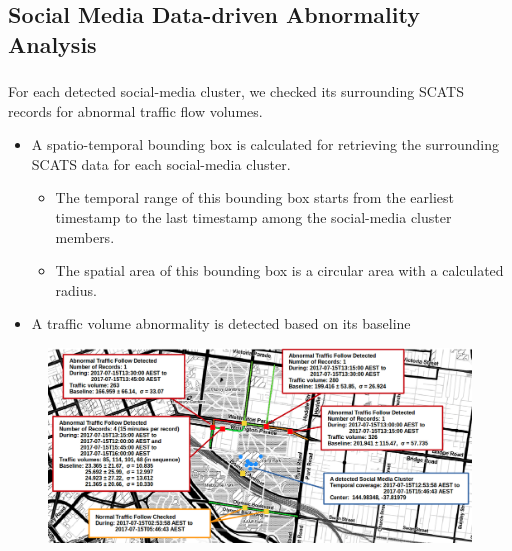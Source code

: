 \subsection{Social Media Data-driven Abnormality Analysis}
\begin{frame}
    \frametitle{}
	 For each detected social-media cluster, we checked its surrounding SCATS records for abnormal traffic flow volumes. 
	 \begin{itemize} \small
	       \item A spatio-temporal bounding box is calculated for retrieving the surrounding SCATS data for each social-media cluster.
	       \begin{itemize} \tiny
	            \item The temporal range of this bounding box starts from the earliest timestamp to the last timestamp among the social-media cluster members.
	            \item The spatial area of this bounding box is a circular area with a calculated radius.
	        \end{itemize}
	        \item A traffic volume abnormality is detected based on its baseline
	 \end{itemize}
	 \vspace{-0.15cm}
	 \begin{figure}
    	\centering
        \includegraphics[width=.9\textwidth]{resource/figures/casestudy2_exp.png}
    \end{figure}
\end{frame}

